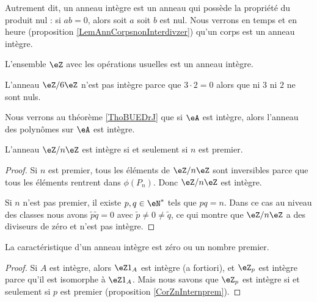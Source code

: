 Autrement dit, un anneau intègre est un anneau qui possède la propriété du produit nul : si \( ab=0\), alors soit \( a\) soit \( b\) est nul. Nous verrons en temps et en heure (proposition \ref{LemAnnCorpsnonInterdivzer}) qu'un corps est un anneau intègre.

\begin{example}
    L'ensemble \( \eZ\) avec les opérations usuelles est un anneau intègre.
\end{example}

\begin{example}
    L'anneau \( \eZ/6\eZ\) n'est pas intègre parce que \( 3\cdot 2=0\) alors que ni \( 3\) ni \( 2\) ne sont nuls.
\end{example}

\begin{example}
    Nous verrons au théorème \ref{ThoBUEDrJ} que si \( \eA\) est intègre, alors l'anneau des polynômes sur \( \eA\) est intègre.
\end{example}

\begin{corollary}   \label{CorZnInternprem}
    L'anneau \( \eZ/n\eZ\) est intègre si et seulement si \( n\) est premier.
\end{corollary}

\begin{proof}
    Si \( n\) est premier, tous les éléments de \( \eZ/n\eZ\) sont inversibles parce que tous les éléments rentrent dans \( \phi(P_n)\). Donc \( \eZ/n\eZ\) est intègre.

    Si \( n\) n'est pas premier, il existe \( p,q\in\eN^*\) tels que \( pq=n\). Dans ce cas au niveau des classes nous avons \( \tilde p\tilde q=0\) avec \( \tilde p\neq 0\neq\tilde q\), ce qui montre que \( \eZ/n\eZ\) a des diviseurs de zéro et n'est pas intègre.
\end{proof}


\begin{lemma}       \label{LemCaractIntergernbrcartpre}
    La caractéristique d'un anneau intègre est zéro ou un nombre premier.
\end{lemma}

\begin{proof}
    Si \( A\) est intègre, alors \( \eZ 1_A\) est intègre (a fortiori), et \( \eZ_p\) est intègre parce qu'il est isomorphe à \( \eZ 1_A\). Mais nous savons que \( \eZ_p\) est intègre si et seulement si \( p\) est premier (proposition \ref{CorZnInternprem}).
\end{proof}

